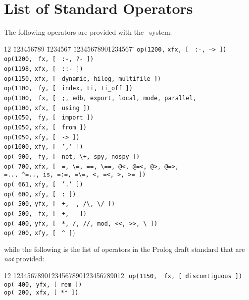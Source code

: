 \section{List of Standard Operators} \label{operator_list}
The following operators are provided with the \ourprolog\ system:
\begin{tabbing}
12 \= 123456789 \= 1234567 \= 12345678901234567 \=	\kill
 \> {\tt op(1200,} \> \verb|xfx, [ | \> {\tt :-, --> ])}\>		\\
 \> {\tt op(1200,} \> \verb| fx, [ | \> {\tt :-, ?- ])}	\>		\\
 \> {\tt op(1198,} \> \verb|xfx, [ | \> {\tt ::- ])}	\>		\\
 \> {\tt op(1150,} \> \verb|xfx, [ | \> {\tt dynamic, hilog, multifile ])} \> \\
 \> {\tt op(1100,} \> \verb| fy, [ | \> {\tt index, ti, ti\_off ])}	\> \\
 \> {\tt op(1100,} \> \verb| fx, [ | \> {\tt ;, edb, export, local, mode,
					 parallel,} \> \\
 \> {\tt op(1100,} \> \verb|xfx, [ | \> {\tt using ])}	\>		\\
 \> {\tt op(1050,} \> \verb| fy, [ | \> {\tt import ])}	\>		\\
 \> {\tt op(1050,} \> \verb|xfx, [ | \> {\tt from ])}	\>		\\
 \> {\tt op(1050,} \> \verb|xfy, [ | \> {\tt -> ])}	\>		\\
 \> {\tt op(1000,} \> \verb|xfy, [ | \> {\tt ',' ])}	\>		\\
 \> {\tt op( 900,} \> \verb| fy, [ | \> {\verb|not, \+, spy, nospy ])|}  \> \\
 \> {\tt op( 700,} \> \verb|xfx, [ | \> {\verb|=, \=, ==, \==, @<, @=<, @>, @=>,|} \>	\\
 \>		   \>		     \> {\verb|=.., ^=.., is, =:=, =\=, <, =<, >, >= ])|}	\> \\
 \> {\tt op( 661,} \> \verb|xfy, [ | \> {\tt '.' ])}	\>		\\
 \> {\tt op( 600,} \> \verb|xfy, [ | \> {\verb|: ])|}	\>		\\
 \> {\tt op( 500,} \> \verb|yfx, [ | \> {\verb|+, -, /\, \/ ])|}	\> \\
 \> {\tt op( 500,} \> \verb| fx, [ | \> {\verb|+, - ])|}		\> \\
 \> {\tt op( 400,} \> \verb|yfx, [ | \> {\verb|*, /, //, mod, <<, >>, \ ])|} \>	\\
 \> {\tt op( 200,} \> \verb|xfy, [ | \> {\verb|^ ]|)}	\>	\\
\end{tabbing}
while the following is the list of operators in the Prolog draft standard
that are {\em not} provided:
\begin{tabbing}
12 \= 12345678901234567890123456789012 \=	\kill
 \> {\tt op(1150, \ fx, [ discontiguous ])}	\>		\\
 \> {\tt op( 400,  yfx, [ rem ])}	\>	\\
 \> {\tt op( 200,  xfx, [ ** ])}	\>	\\
\end{tabbing}

